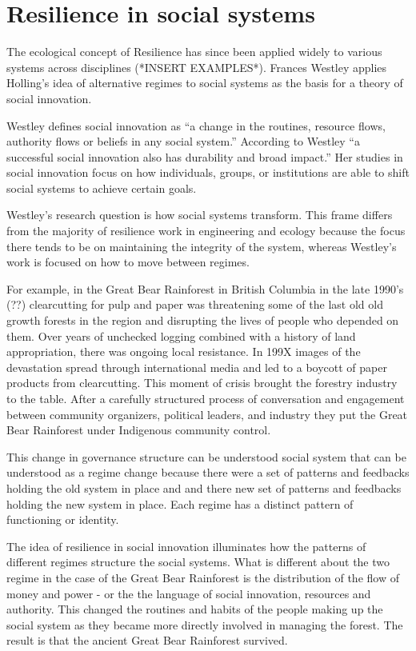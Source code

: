 \section{Resilience in social systems}

The ecological concept of Resilience has since been applied widely to various systems across disciplines (*INSERT EXAMPLES*). Frances Westley applies Holling’s idea of alternative regimes to social systems as the basis for a theory of social innovation. 

Westley defines social innovation as “a change in the routines, resource flows, authority flows or beliefs in any social system.” According to Westley “a successful social innovation also has durability and broad impact.” 
Her studies in social innovation focus on how individuals, groups, or institutions are able to shift social systems to achieve certain goals. 

Westley’s research question is how social systems transform. This frame differs from the majority of resilience work in engineering and ecology because the focus there tends to be on maintaining the integrity of the system, whereas Westley’s work is focused on how to move between regimes. 

For example, in the Great Bear Rainforest in British Columbia in the late 1990’s (??) clearcutting for pulp and paper was threatening some of the last old old growth forests in the region and disrupting the lives of people who depended on them. Over years of unchecked logging combined with a history of land appropriation, there was ongoing local resistance. In 199X images of the devastation spread through international media and led to a boycott of paper products from clearcutting. This moment of crisis brought the forestry industry to the table. After a carefully structured process of conversation and engagement between community organizers, political leaders, and industry they put the Great Bear Rainforest under Indigenous community control. 

This change in governance structure can be understood social system that can be understood as a regime change because there were a set of patterns and feedbacks holding the old system in place and and there new set of patterns and feedbacks holding the new system in place. Each regime has a distinct pattern of functioning or identity. 

The idea of resilience in social innovation illuminates how the patterns of different regimes structure the social systems. What is different about the two regime in the case of the Great Bear Rainforest is the distribution of the flow of money and power - or the the language of social innovation, resources and authority. This changed the routines and habits of the people making up the social system as they became more directly involved in managing the forest. The result is that the ancient Great Bear Rainforest survived. 

